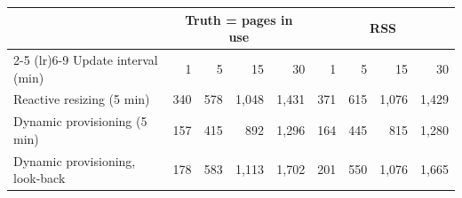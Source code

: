 \begin{tabular}{lrrrrrrrr}
\toprule
 & \multicolumn{4}{c}{Truth = pages in use} & \multicolumn{4}{c}{RSS} \\
\cmidrule(lr){2-5} \cmidrule(lr){6-9}
Update interval (min) & 1 & 5 & 15 & 30 & 1 & 5 & 15 & 30 \\
\midrule
Reactive resizing (5 min) & 340 & 578 & 1{,}048 & 1{,}431 & 371 & 615 & 1{,}076 & 1{,}429 \\
Dynamic provisioning (5 min) & 157 & 415 & 892 & 1{,}296 & 164 & 445 & 815 & 1{,}280 \\
Dynamic provisioning, look-back & 178 & 583 & 1{,}113 & 1{,}702 & 201 & 550 & 1{,}076 & 1{,}665 \\
\bottomrule
\end{tabular}
